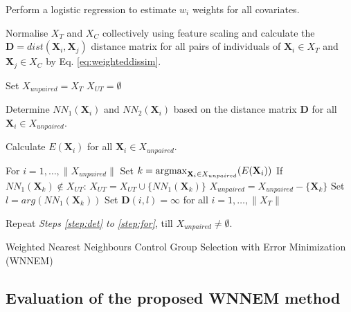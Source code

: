 		\begin{algorithm}
																
			Perform a logistic regression to estimate $w_i$ weights for all covariates.
																
			Normalise $X_T$ and $X_C$ collectively using feature scaling and calculate the $\textbf{D}=dist(\textbf{X}_i, \textbf{X}_j)$ distance matrix for all pairs of individuals of $\textbf{X}_i \in X_T$ and $\textbf{X}_j \in X_C$ by Eq. \ref{eq:weighteddissim}.
																
			Set 
			\linebreak
			\text{\quad}
			$X_{unpaired}=X_T$
			\linebreak
			\text{\quad}
			$X_{UT}=\emptyset$ 
																
			Determine $NN_1(\textbf{X}_i)$ and $NN_2(\textbf{X}_i)$ based on the distance matrix $\textbf{D}$ for all $\textbf{X}_i \in X_{unpaired}$. \label{step:det}
																
			Calculate $E(\textbf{X}_i)$  for all $\textbf{X}_i \in X_{unpaired}$. 
																
			For $i=1, \dots, \|X_{unpaired}\|$ 
			\linebreak
			\text{\quad}Set $k=\operatorname*{argmax}_{\textbf{X}_i \in X_{unpaired}} (E(\textbf{X}_i))$
			\linebreak
			\text{\quad}
			If $NN_1(\textbf{X}_k) \notin X_{UT}$:
			\linebreak
			\text{\qquad}
			$X_{UT}=X_{UT}\cup\{NN_1(\textbf{X}_k)\}$
			\linebreak
			\text{\qquad}
			$X_{unpaired}=X_{unpaired}-\{\textbf{X}_k\}$
			\linebreak
			\text{\qquad}
			Set $l=arg(NN_1(\textbf{X}_k))$
			\linebreak
			\text{\qquad}
			Set $\textbf{D}(i,l)=\infty$ for all $i=1, \dots, \|X_T\|$ \label{step:for}
																
			Repeat \textit{Steps \ref{step:det} to \ref{step:for}}, till $X_{unpaired}\neq\emptyset$.
																
			\caption{Weighted Nearest Neighbours Control Group Selection with Error Minimization (WNNEM)}
			\label{algo:wnnem}
		\end{algorithm}
						  
		\subsection{Evaluation of the proposed WNNEM method}
		\label{sec:eval_wnnem}
										

